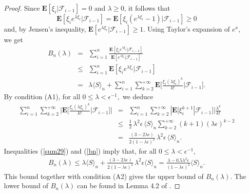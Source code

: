 \documentclass{gSTA2e}
\theoremstyle{plain}
\theoremstyle{definition}
\theoremstyle{remark}
\begin{document}
\begin{proof}
 Since $\mathbf{E}[\xi _i|\mathcal{F}_{i-1}]=0$ and $\lambda\geq 0$,  it follows that
 \[
\mathbf{E}[\xi_{i} e^{\lambda\xi_{i}} |\mathcal{F}_{i-1}]=\mathbf{E}[\xi_{i}(e^{\lambda\xi_{i}}-1)|\mathcal{F}_{i-1}]\geq 0
\]
and, by Jensen's inequality,
$\mathbf{E}[e^{\lambda \xi _i}|\mathcal{F}_{i-1}]\geq 1$.
Using Taylor's expansion of $e^x$, we get
\begin{eqnarray}\label{bn}
B_n(\lambda ) & =& \sum_{i=1}^{n} \frac{\mathbf{E}[\xi_{i} e^{\lambda \xi_{i}} | \mathcal{F}_{i-1}]}{\mathbf{E}[ e^{\lambda \xi_{i}} | \mathcal{F}_{i-1}]}  \nonumber\\
& \leq & \sum_{i=1}^{n}\mathbf{E}[\xi_{i} e^{\lambda \xi_{i}} | \mathcal{F}_{i-1}]\nonumber\\
 & = &  \lambda\langle S\rangle_{n}+ \sum_{i=1}^{n}\sum_{k=2}^{+\infty}\mathbf{E}\bigg[\frac{\xi_{i}(\lambda\xi_{i})^{k}}{k !} \bigg| \mathcal{F}_{i-1} \bigg]   .
\end{eqnarray}
By condition (A1), for all $0 \leq \lambda < \epsilon^{-1} ,$ we deduce
\begin{eqnarray}\label{sum29}
  \sum_{i=1}^{n}\sum_{k=2}^{+\infty}\bigg| \mathbf{E}\bigg[\frac{\xi_{i}(\lambda\xi_{i})^{k}}{k !} \bigg| \mathcal{F}_{i-1} \bigg] \bigg|
  & = & \sum_{i=1}^{n}\sum_{k=2}^{+\infty}|\mathbf{E}[\xi_{i}^{k+1}| \mathcal{F}_{i-1}]| \frac{\lambda^k}{k !} \ \nonumber\\
  & \leq & \frac12\, \lambda^2 \epsilon \,  \langle S \rangle_{n} \sum_{k=2}^{+\infty}(k+1)(\lambda\epsilon)^{k-2} \nonumber \\
& = & \frac{(3-2\lambda\epsilon)}{2(1-\lambda\epsilon)^2}\, \lambda^2 \epsilon \, \langle S \rangle_{n}  .
\end{eqnarray}
Inequalities (\ref{sum29}) and (\ref{bn}) imply that, for all $0 \leq \lambda < \epsilon^{-1} ,$
\begin{eqnarray*}
 B_n(\lambda )  \leq  \lambda\langle S \rangle_{n} +  \frac{(3-2\lambda\epsilon)}{2(1-\lambda\epsilon)^2}\, \lambda^2 \epsilon  \langle S \rangle_{n}
  =   \frac{\lambda-0.5\lambda^2\epsilon}{ (1-\lambda\epsilon)^2} \langle S \rangle_{n}.
\end{eqnarray*}
This bound together with condition (A2) gives  the upper bound of $B_{n}(\lambda)$. The lower bound of $B_{n}(\lambda)$ can be found in Lemma 4.2 of \cite{FGL13}.
\end{proof}
\end{document}
